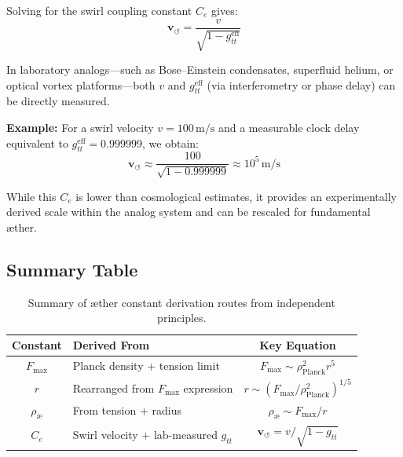 \documentclass[a4paper,12pt]{article}
\renewcommand{\arraystretch}{1.5}
\begin{document}
        Solving for the swirl coupling constant $C_e$ gives:
        \begin{equation}
            \mathbf{v}_{\scriptscriptstyle\boldsymbol{\circlearrowleft}} = \frac{v}{\sqrt{1 - g_{tt}^{\text{eff}}}}
        \end{equation}

        In laboratory analogs—such as Bose–Einstein condensates, superfluid helium, or optical vortex platforms—both $v$ and $g_{tt}^{\text{eff}}$ (via interferometry or phase delay) can be directly measured.

        \textbf{Example:} For a swirl velocity $v = 100 \, \text{m/s}$ and a measurable clock delay equivalent to $g_{tt}^{\text{eff}} = 0.999999$, we obtain:
        \begin{equation}
            \mathbf{v}_{\scriptscriptstyle\boldsymbol{\circlearrowleft}} \approx \frac{100}{\sqrt{1 - 0.999999}} \approx 10^5 \, \text{m/s}
        \end{equation}

        While this $C_e$ is lower than cosmological estimates, it provides an experimentally derived scale within the analog system and can be rescaled for fundamental æther.

        \subsection{ Summary Table}

        \begin{table}[H]
        \centering
        \renewcommand{\arraystretch}{1.2}
        \begin{tabular}{|c|l|c|}
        \hline
        \textbf{Constant} & \textbf{Derived From} & \textbf{Key Equation} \\
        \hline
        $F_{\max}$ & Planck density + tension limit & $F_{\max} \sim \rho_{\text{Planck}}^2 r^5$ \\
        $r$ & Rearranged from $F_{\max}$ expression & $r \sim \left(F_{\max} / \rho_{\text{Planck}}^2\right)^{1/5}$ \\
        $\rho_{\text{æ}}$ & From tension + radius & $\rho_{\text{æ}} \sim F_{\max} / r$ \\
        $C_e$ & Swirl velocity + lab-measured $g_{tt}$ & $\mathbf{v}_{\scriptscriptstyle\boldsymbol{\circlearrowleft}} = v / \sqrt{1 - g_{tt}}$ \\
        \hline
        \end{tabular}
        \caption{Summary of æther constant derivation routes from independent principles.}
        \end{table}
\end{document}
